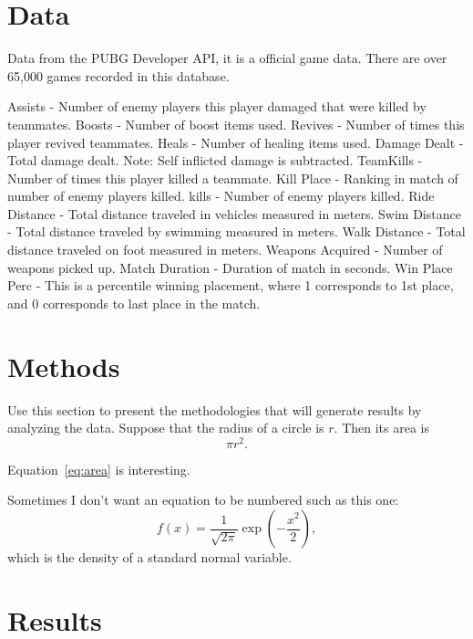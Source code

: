 \documentclass[12pt]{article}
\begin{document}
\section{Data}
\label{sec:data}

Data from the PUBG Developer API, it  is a official game data. There are over 65,000 games recorded in this database.  

Assists - 			Number of enemy players this player damaged that were killed by teammates.
Boosts -          		Number of boost items used.
Revives - 	     		Number of times this player revived teammates.
Heals - 	     		Number of healing items used.
Damage Dealt - 		Total damage dealt. Note: Self inflicted damage is subtracted.
TeamKills - 		Number of times this player killed a teammate.
Kill Place - 		Ranking in match of number of enemy players killed.
kills - 			Number of enemy players killed.
Ride Distance - 		Total distance traveled in vehicles measured in meters.
Swim Distance - 	Total distance traveled by swimming measured in meters.
Walk Distance - 	Total distance traveled on foot measured in meters.
Weapons Acquired - 	Number of weapons picked up.
Match Duration - 	Duration of match in seconds.
Win Place Perc -  	This is a percentile winning placement, where 1 corresponds to 1st place, and 0 corresponds to last place in the match.




\section{Methods}
\label{sec:meth}

Use this section to present the methodologies that will generate results by
analyzing the data. Suppose that the radius of a circle is $r$. Then its area is
\begin{equation}
  \label{eq:area}
  \pi r^2.
\end{equation}

Equation~\eqref{eq:area} is interesting. \lipsum[1-4]

Sometimes I don't want an equation to be numbered such as this one:
\[
  f(x) = \frac{1}{\sqrt{2\pi}} \exp\left( - \frac{x^2}{2} \right),
\]
which is the density of a standard normal variable.



\section{Results}
\label{sec:resu}
\end{document}
